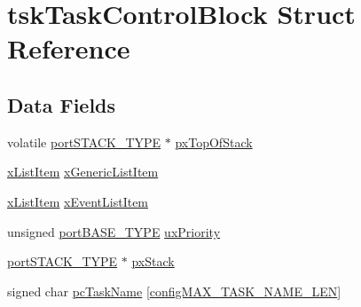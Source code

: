 \hypertarget{structtsk_task_control_block}{\section{tsk\-Task\-Control\-Block Struct Reference}
\label{structtsk_task_control_block}
}
\subsection*{Data Fields}
\begin{DoxyCompactItemize}
\item 
volatile \hyperlink{portmacro_8h_ab0a294066ac7369b8f59a52d9491a92c}{port\-S\-T\-A\-C\-K\-\_\-\-T\-Y\-P\-E} $\ast$ \hyperlink{structtsk_task_control_block_a2f21c253445a66961c936f8e79783cff}{px\-Top\-Of\-Stack}
\item 
\hyperlink{list_8h_abc3e65a10b5c5f39142e64e69311797f}{x\-List\-Item} \hyperlink{structtsk_task_control_block_a39d74720fd46611d1223644cb9e539eb}{x\-Generic\-List\-Item}
\item 
\hyperlink{list_8h_abc3e65a10b5c5f39142e64e69311797f}{x\-List\-Item} \hyperlink{structtsk_task_control_block_a110903e360ab25721be3682104ded665}{x\-Event\-List\-Item}
\item 
unsigned \hyperlink{portmacro_8h_a1ebe82d24d764ae4e352f7c3a9f92c01}{port\-B\-A\-S\-E\-\_\-\-T\-Y\-P\-E} \hyperlink{structtsk_task_control_block_af9efa11aaf2bd2b1e7b0da3991a493c8}{ux\-Priority}
\item 
\hyperlink{portmacro_8h_ab0a294066ac7369b8f59a52d9491a92c}{port\-S\-T\-A\-C\-K\-\_\-\-T\-Y\-P\-E} $\ast$ \hyperlink{structtsk_task_control_block_ab6f86bf9da6d5df87a4272383cc7e4f4}{px\-Stack}
\item 
signed char \hyperlink{structtsk_task_control_block_ae2168a3ab594256a9496078ec2ba9d47}{pc\-Task\-Name} \mbox{[}\hyperlink{_free_r_t_o_s_config_8h_ac388dc4041aab6997348828eb27fc1a8}{config\-M\-A\-X\-\_\-\-T\-A\-S\-K\-\_\-\-N\-A\-M\-E\-\_\-\-L\-E\-N}\mbox{]}
\end{DoxyCompactItemize}



